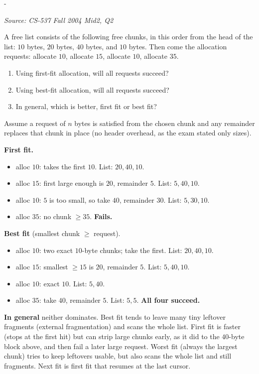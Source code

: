 \documentclass[11pt,a4paper]{article}
\makeatletter
\newcommand{\keepspace}[1]{\par\penalty-100\begingroup
  \setlength{\dimen@}{#1}\dimen@ii\pagegoal\advance\dimen@ii-\pagetotal
  \ifdim\dimen@>\dimen@ii\ifdim\dimen@ii>\z@\vfil\fi\break\fi\endgroup}
\newcounter{qn}[section]
\newenvironment{Qn}[4]{%
  \refstepcounter{qn}\keepspace{7\baselineskip}%
  \begin{tcolorbox}[qboxstyle, title={Q\thesection.\theqn\ \ [#1 \textbar\ #2]\ \ #4}]%
  {\footnotesize\color{g3}\textit{Source: #3}}\par\smallskip%
}{%
  \end{tcolorbox}%
}
\newenvironment{Sol}{%
  \begin{tcolorbox}[sboxstyle, title={Solution}]%
}{%
  \end{tcolorbox}\vspace{0.35em}%
}
\makeatother
\begin{document}
\begin{Qn}{Hard}{Lect 11}{CS-537 Fall 2004 Mid2, Q2}{First-fit vs.\ best-fit on a four-chunk free list}
A free list consists of the following free chunks, in this order from
the head of the list: $10$ bytes, $20$ bytes, $40$ bytes, and
$10$ bytes. Then come the allocation requests: allocate $10$, allocate
$15$, allocate $10$, allocate $35$.
\begin{enumerate}
  \item Using first-fit allocation, will all requests succeed?
  \item Using best-fit allocation, will all requests succeed?
  \item In general, which is better, first fit or best fit?
\end{enumerate}
\end{Qn}
\begin{Sol}
Assume a request of $n$ bytes is satisfied from the chosen chunk and
any remainder replaces that chunk in place (no header overhead, as the
exam stated only sizes).

\textbf{First fit.}
\begin{itemize}
  \item alloc $10$: takes the first $10$. List: $20,40,10$.
  \item alloc $15$: first large enough is $20$, remainder $5$.
        List: $5,40,10$.
  \item alloc $10$: $5$ is too small, so take $40$, remainder $30$.
        List: $5,30,10$.
  \item alloc $35$: no chunk $\ge 35$. \textbf{Fails.}
\end{itemize}

\textbf{Best fit} (smallest chunk $\ge$ request).
\begin{itemize}
  \item alloc $10$: two exact $10$-byte chunks; take the first.
        List: $20,40,10$.
  \item alloc $15$: smallest $\ge 15$ is $20$, remainder $5$.
        List: $5,40,10$.
  \item alloc $10$: exact $10$. List: $5,40$.
  \item alloc $35$: take $40$, remainder $5$. List: $5,5$.
        \textbf{All four succeed.}
\end{itemize}

\textbf{In general} neither dominates. Best fit tends to leave many
tiny leftover fragments (external fragmentation) and scans the whole
list. First fit is faster (stops at the first hit) but can strip large
chunks early, as it did to the $40$-byte block above, and then fail a
later large request. Worst fit (always the largest chunk) tries to
keep leftovers usable, but also scans the whole list and still
fragments. Next fit is first fit that resumes at the last cursor.
\end{Sol}
\end{document}

